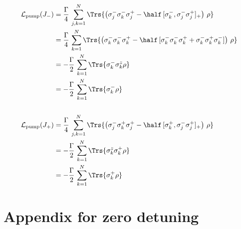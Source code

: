     \begin{align*}
        \mathcal{L}_\text{pump}(J_-)&=\frac{\Gamma}{4}\,\sum_{j,k=1}^N \Trs{\left( \sigma_j^- \sigma_k^- \sigma_j^+ -\half\,[\sigma_k^-,\sigma_j^-\sigma_j^+]_+   \right)\,\rho}\\
        &=\frac{\Gamma}{4}\,\sum_{k=1}^N \Trs{\left( \sigma_k^- \sigma_k^- \sigma_k^+ -\half\,[\sigma_k^-\sigma_k^-\sigma_k^++\sigma_k^-\sigma_k^+\sigma_k^-]   \right)\,\rho}\\
        &=-\frac{\Gamma}{2}\,\sum_{k=1}^N\Trs{\sigma_k^-\sigma_k^z\rho}\\
        &=-\frac{\Gamma}{2}\,\sum_{k=1}^N\Trs{\sigma_k^-\rho}\\\\
        \mathcal{L}_\text{pump}(J_+)&=\frac{\Gamma}{4}\,\sum_{j,k=1}^N \Trs{\left( \sigma_j^- \sigma_k^+ \sigma_j^+ -\half\,[\sigma_k^+,\sigma_j^-\sigma_j^+]_+   \right)\,\rho}\\
        &=-\frac{\Gamma}{2}\,\sum_{k=1}^N\Trs{\sigma_k^z\sigma_k^+\rho}\\
        &=-\frac{\Gamma}{2}\,\sum_{k=1}^N\Trs{\sigma_k^+\rho}
    \end{align*}
    
    \chapter{Appendix for zero detuning}
